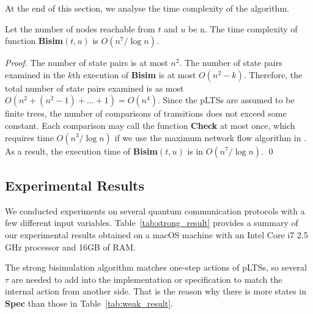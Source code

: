 \documentclass[a4paper,runningheads]{llncs}
\begin{document}
At the end of this section, we analyse the time complexity of the algorithm.

\begin{theorem}[Complexity]\label{thm:strong_alg_complexity}
Let the number of nodes reachable from $t$ and $u$ be n. The time complexity of function \textbf{Bisim}$(t,u)$ is $O(n^7/\log{n})$. %
\end{theorem}
\begin{proof}
The number of state pairs is at most $n^2$. The number of state pairs examined in the $k$th execution of \textbf{Bisim} is at most $O(n^2-k)$. Therefore, the total number of state pairs examined is as most $O(n^2+(n^2-1)+...+1)=O(n^4)$. Since the pLTSs are assumed to be finite trees, the number of comparisons of transitions does not exceed some constant. Each comparison may call the function \textbf{Check} at most once, which requires time $O(n^3/\log{n})$ if we use the maximum network flow algorithm in \cite{CHM90}. As a result, the execution time of \textbf{Bisim}$(t,u)$ is in $O(n^7/\log{n})$.
\qed
\end{proof}

\subsection{Experimental Results}\label{sec:strong_bisim_exper}
We conducted experiments on several quantum communication protocols with a few different input variables.  
Table~\ref{tab:strong_result} provides a summary of our experimental results obtained on a macOS machine with an Intel Core i7 2.5 GHz processor and 16GB of RAM. 

The strong bisimulation algorithm matches one-step actions of pLTSs, so several $\tau$ are needed to add into the implementation or specification to match the internal action from another side. That is the reason why there is more states in \textbf{Spec} than those in Table~\ref{tab:weak_result}.
\end{document}
